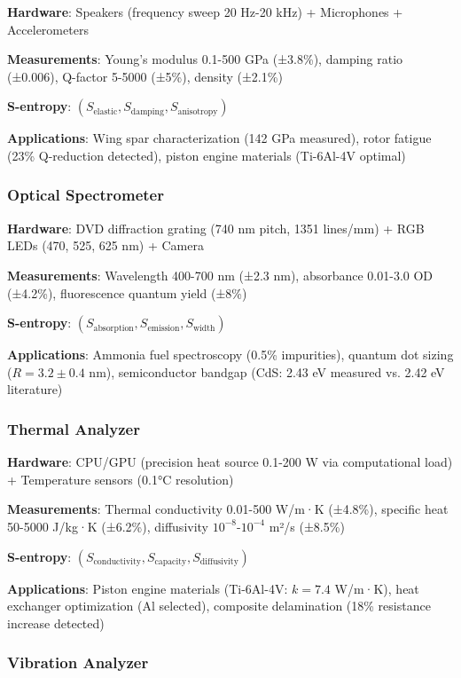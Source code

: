 \documentclass[12pt,a4paper]{article}
\begin{document}
\textbf{Hardware}: Speakers (frequency sweep 20 Hz-20 kHz) + Microphones + Accelerometers

\textbf{Measurements}: Young's modulus 0.1-500 GPa (±3.8\%), damping ratio (±0.006), Q-factor 5-5000 (±5\%), density (±2.1\%)

\textbf{S-entropy}: $(S_{\text{elastic}}, S_{\text{damping}}, S_{\text{anisotropy}})$

\textbf{Applications}: Wing spar characterization (142 GPa measured), rotor fatigue (23\% Q-reduction detected), piston engine materials (Ti-6Al-4V optimal)

\subsubsection{Optical Spectrometer \cite{sachikonye2024spectrometer}}

\textbf{Hardware}: DVD diffraction grating (740 nm pitch, 1351 lines/mm) + RGB LEDs (470, 525, 625 nm) + Camera

\textbf{Measurements}: Wavelength 400-700 nm (±2.3 nm), absorbance 0.01-3.0 OD (±4.2\%), fluorescence quantum yield (±8\%)

\textbf{S-entropy}: $(S_{\text{absorption}}, S_{\text{emission}}, S_{\text{width}})$

\textbf{Applications}: Ammonia fuel spectroscopy (0.5\% impurities), quantum dot sizing ($R = 3.2 \pm 0.4$ nm), semiconductor bandgap (CdS: 2.43 eV measured vs. 2.42 eV literature)

\subsubsection{Thermal Analyzer \cite{sachikonye2024thermal_analyzer}}

\textbf{Hardware}: CPU/GPU (precision heat source 0.1-200 W via computational load) + Temperature sensors (0.1°C resolution)

\textbf{Measurements}: Thermal conductivity 0.01-500 W/m·K (±4.8\%), specific heat 50-5000 J/kg·K (±6.2\%), diffusivity $10^{-8}$-$10^{-4}$ m²/s (±8.5\%)

\textbf{S-entropy}: $(S_{\text{conductivity}}, S_{\text{capacity}}, S_{\text{diffusivity}})$

\textbf{Applications}: Piston engine materials (Ti-6Al-4V: $k = 7.4$ W/m·K), heat exchanger optimization (Al selected), composite delamination (18\% resistance increase detected)

\subsubsection{Vibration Analyzer \cite{sachikonye2024vibration_analyzer}}
\end{document}
